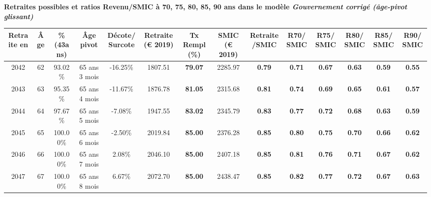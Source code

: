  \vspace{0.1cm} 
{\bf \noindent Retraites possibles et ratios Revenu/SMIC à 70, 75, 80, 85, 90 ans dans le modèle \emph{Gouvernement corrigé (âge-pivot glissant)}}  
 
\begin{adjustbox}{max width=\textwidth} 
\begin{tabular}[htb]{|c|c||c|c|c||c|c||c|c||c|c|c|c|c|} 
\hline 
 Retraite en &  Âge &  \%(43ans) &  Âge pivot &  Décote/Surcote &  Retraite (\euro{} 2019) &  Tx Rempl(\%) &  SMIC (\euro{} 2019) &  Retraite/SMIC &  R70/SMIC &  R75/SMIC &  R80/SMIC &  R85/SMIC &  R90/SMIC \\ 
\hline \hline 
 2042 &  62 &  93.02\% &  65 ans 3 mois &  -16.25\% &  1807.51 &  {\bf 79.07} &  2285.97 &  {\bf {\color{red} 0.79}} &  {\bf {\color{red} 0.71}} &  {\bf {\color{red} 0.67}} &  {\bf {\color{red} 0.63}} &  {\bf {\color{red} 0.59}} &  {\bf {\color{red} 0.55}} \\ 
\hline 
 2043 &  63 &  95.35\% &  65 ans 4 mois &  -11.67\% &  1876.78 &  {\bf 81.05} &  2315.68 &  {\bf {\color{red} 0.81}} &  {\bf {\color{red} 0.74}} &  {\bf {\color{red} 0.69}} &  {\bf {\color{red} 0.65}} &  {\bf {\color{red} 0.61}} &  {\bf {\color{red} 0.57}} \\ 
\hline 
 2044 &  64 &  97.67\% &  65 ans 5 mois &  -7.08\% &  1947.55 &  {\bf 83.02} &  2345.79 &  {\bf {\color{red} 0.83}} &  {\bf {\color{red} 0.77}} &  {\bf {\color{red} 0.72}} &  {\bf {\color{red} 0.68}} &  {\bf {\color{red} 0.63}} &  {\bf {\color{red} 0.59}} \\ 
\hline 
 2045 &  65 &  100.00\% &  65 ans 6 mois &  -2.50\% &  2019.84 &  {\bf 85.00} &  2376.28 &  {\bf {\color{red} 0.85}} &  {\bf {\color{red} 0.80}} &  {\bf {\color{red} 0.75}} &  {\bf {\color{red} 0.70}} &  {\bf {\color{red} 0.66}} &  {\bf {\color{red} 0.62}} \\ 
\hline 
 2046 &  66 &  100.00\% &  65 ans 7 mois &  2.08\% &  2046.10 &  {\bf 85.00} &  2407.18 &  {\bf {\color{red} 0.85}} &  {\bf {\color{red} 0.81}} &  {\bf {\color{red} 0.76}} &  {\bf {\color{red} 0.71}} &  {\bf {\color{red} 0.67}} &  {\bf {\color{red} 0.62}} \\ 
\hline 
 2047 &  67 &  100.00\% &  65 ans 8 mois &  6.67\% &  2072.70 &  {\bf 85.00} &  2438.47 &  {\bf {\color{red} 0.85}} &  {\bf {\color{red} 0.82}} &  {\bf {\color{red} 0.77}} &  {\bf {\color{red} 0.72}} &  {\bf {\color{red} 0.67}} &  {\bf {\color{red} 0.63}} \\ 
\hline 
\hline 
\end{tabular} 
\end{adjustbox} 
 
